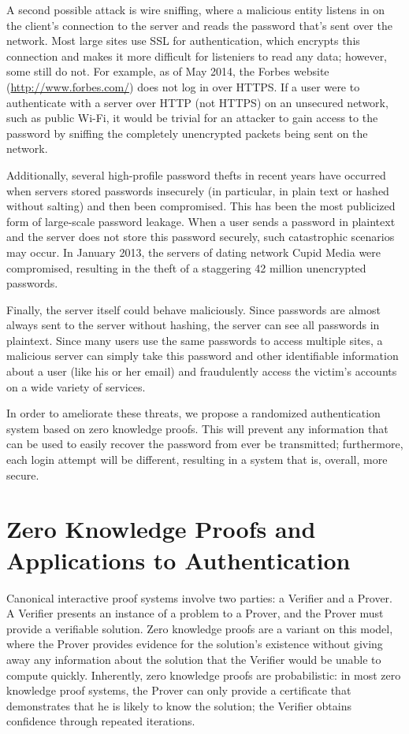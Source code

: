 \documentclass[11pt]{article}
\begin{document}
A second possible attack is wire sniffing, where a malicious entity listens in on the client's connection to the server and reads the password that's sent over the network\cite{Lum}. Most large sites use SSL for authentication, which encrypts this connection and makes it more difficult for listeniers to read any data; however, some still do not. For example, as of May 2014, the Forbes website (\url{http://www.forbes.com/}) does not log in over HTTPS. If a user were to authenticate with a server over HTTP (not HTTPS) on an unsecured network, such as public Wi-Fi, it would be trivial for an attacker to gain access to the password by sniffing the completely unencrypted packets being sent on the network. 

Additionally, several high-profile password thefts in recent years have occurred when servers stored passwords insecurely (in particular, in plain text or hashed without salting) and then been compromised.  This has been the most publicized form of large-scale password leakage.  When a user sends a password in plaintext and the server does not store this password securely, such catastrophic scenarios may occur.  In January 2013, the servers of dating network Cupid Media were compromised, resulting in the theft of a staggering 42 million unencrypted passwords.  \cite{Donohue}

Finally, the server itself could behave maliciously. Since passwords are almost always sent to the server without hashing, the server can see all passwords in plaintext. Since many users use the same passwords to access multiple sites, a malicious server can simply take this password and other identifiable information about a user (like his or her email) and fraudulently access the victim's accounts on a wide variety of services.

In order to ameliorate these threats, we propose a randomized authentication system based on zero knowledge proofs. This will prevent any information that can be used to easily recover the password from ever be transmitted; furthermore, each login attempt will be different, resulting in a system that is, overall, more secure.

\section{Zero Knowledge Proofs and Applications to Authentication}

Canonical interactive proof systems involve two parties: a Verifier and a Prover\cite{Goldwasser}.  A Verifier presents an instance of a problem to a Prover, and the Prover must provide a verifiable solution. Zero knowledge proofs are a variant on this model, where the Prover provides evidence for the solution's existence without giving away any information about the solution that the Verifier would be unable to compute quickly.  Inherently, zero knowledge proofs are probabilistic: in most zero knowledge proof systems, the Prover can only provide a certificate that demonstrates that he is likely to know the solution; the Verifier obtains confidence through repeated iterations.
\end{document}
